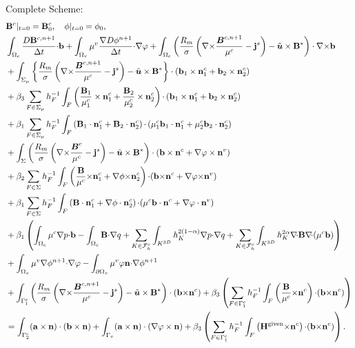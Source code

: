 \documentclass[11pt]{amsart}
\begin{document}
\newpage
Complete Scheme:\\
\begin{align*}
&{\bf B}^c |_{t=0}  = {\bf B}_0 ^c, \quad \phi |_{t=0}= \phi _0,\\
& \int_{{\Omega_c}}\frac{D{\bf B}^{c,n+1}}{\Delta t}{\cdot} {\bf b}
+ \int_{{\Omega_v}} \mu^v\frac{\nabla D\phi^{n+1}}{\Delta t}{\cdot} \nabla\varphi 
+\int _{\Omega_c} \left ( \frac{R_m}{\sigma}  \left (\nabla{\times} \frac{\text{\boldmath $B$} ^{c,n+1}}{\mu^c} - {\bf j}^s \right)
 - \tilde {\text{\boldmath $u$}} \times  {\bf B}^* \right )\cdot \nabla{\times} {\bf b} 
\\
& +\int _{\Sigma_{\mu}} \left \{  \frac{R_m}{\sigma} \left (\nabla{\times} \frac{\text{\boldmath $B$} ^{c,n+1}}{\mu^c} - {\bf j}^s \right) - \tilde {\text{\boldmath $u$}} \times {\bf B}^*  \right \} \cdot  \left ( { {\bf b}_1}\times {\bf n}_1^c + { {\bf b}_2}\times {\bf n}_2^c\right )\\
& +\beta_3 \sum_{F\in
    \Sigma_{\mu }} h_F^{-1}\int_{F}   \left ( \frac{ {\bf B}_1}{\mu^c_1}\times {\bf n}_1^c + \frac{{\bf B}_2}{\mu^c_2}\times {\bf n}_2^c\right ) {\cdot}   \left ( { {\bf b}_1}\times {\bf n}_1^c + { {\bf b}_2}\times {\bf n}_2^c\right )\\
& +\beta_1 \sum_{F\in
    \Sigma_{\mu }} h_F^{-1}\int_{F}   \left ( { {\bf B}_1}\cdot {\bf n}_1^c + {{\bf B}_2}\cdot {\bf n}_2^c\right ) {\cdot}   \left ( {\mu^c_1}{ {\bf b}_1}\cdot {\bf n}_1^c + {\mu^c_2}{ {\bf b}_2}\cdot {\bf n}_2^c\right )\\
&+\int _{\Sigma}\left (  \frac{R_m}{\sigma}\left (\nabla{\times} \frac{\text{\boldmath $B$} ^c}{\mu^c} - {\bf j}^s \right) - \tilde {\text{\boldmath $u$}} \times {\bf B}^*  \right )\cdot \left ( { {\bf b} }\times  {\bf n}^c +  \nabla \varphi \times {\bf n}^v\right)\\
&+ \beta_2 \sum_{F\in \Sigma} h_F^{-1}\int_{F}  \left ( \frac{{\bf B}}{\mu^c}{\times} {\bf n}_1^c + {\nabla \phi}{\times} {\bf n}_2^c\right )  {\cdot} ({\bf b}{\times} {\bf n}^c +
  \nabla\varphi{\times} {\bf n}^v)\\
&+ \beta_1 \sum_{F\in \Sigma} h_F^{-1}\int_{F}  \left ( { {\bf B}}\cdot {\bf n}_1^c + {\nabla \phi}\cdot {\bf n}_2^c\right )  {\cdot} ({\mu^c}{\bf b}\cdot {\bf n}^c +
  \nabla\varphi \cdot {\bf n}^v)\\
& + \beta_1\left(\int_{\Omega_c} \mu^c\nabla p{\cdot}{\bf b}
- \int_{\Omega_c} {\bf B}{\cdot}\nabla q + \sum_{K\in{\mathcal F}_h^c}
\int_{K^{3D}} h_K^{2(1-\alpha)}\nabla p{\cdot} \nabla q  
+ \sum_{K\in{\mathcal F}_h^c} \int_{K^{3D}}
h_K^{2\alpha}\nabla\!{\cdot} {\bf B} \nabla\!{\cdot} ({\mu^c}  {\bf b})\right)\\
&+\int_{\Omega_v} \mu^v\nabla\phi^{n+1}{\cdot} \nabla\varphi -
\int_{\partial\Omega_v} \mu^v\varphi {\bf n}{\cdot} \nabla \phi^{n+1}\\
&+  
\int _{\Gamma^c _1} \left ( \frac{R_m}{\sigma}  \left (\nabla{\times} \frac{\text{\boldmath $B$} ^{c,n+1}}{\mu^c} - {\bf j}^s \right)
 - \tilde {\text{\boldmath $u$}} \times  {\bf B}^* \right )\cdot ( {\bf b}  {\times} {\bf n}^c)
+ \beta _3\left (
\sum_{F\in \Gamma ^c _1} h_F^{-1}\int_{F}  \left ( \frac{ {\bf B}}{\mu^c}{\times} {\bf n}^c \right )  {\cdot} ({\bf b}{\times} {\bf n}^c)
\right )\\
&=\int _{\Gamma ^c _2}({\bf a} \times {\bf n}) \cdot \left ({{\bf b}} \times {\bf n} \right) + \int_{\Gamma _v}({\bf a} \times {\bf n}) \cdot (\nabla \varphi \times {\bf n})
+
\beta _3 \left ( \sum_{F\in \Gamma ^c _1} h_F^{-1}\int_{F}  \left ( {{\bf H}}^{\text{given}}{\times} {\bf n}^c \right )  {\cdot} ({\bf b}{\times} {\bf n}^c) \right).
\end{align*}
\end{document}
